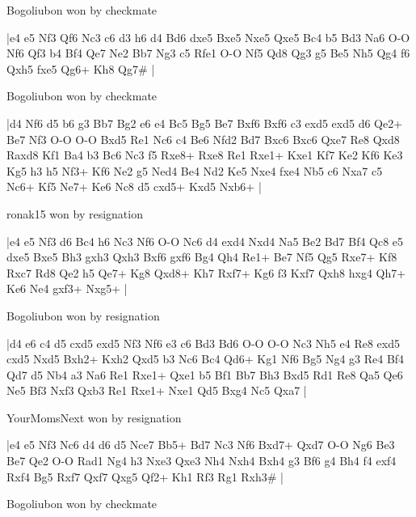 \showboard

Bogoliubon won by checkmate

\makegametitle
|e4 e5 Nf3 Qf6 Nc3 c6 d3 h6 d4 Bd6 dxe5 Bxe5 Nxe5 Qxe5 Bc4 b5 Bd3 Na6 O-O Nf6 Qf3 b4 Bf4 Qe7 Ne2 Bb7 Ng3 c5 Rfe1 O-O Nf5 Qd8 Qg3 g5 Be5 Nh5 Qg4 f6 Qxh5 fxe5 Qg6+ Kh8 Qg7\#  |

\showboard

Bogoliubon won by checkmate

\makegametitle
|d4 Nf6 d5 b6 g3 Bb7 Bg2 e6 e4 Bc5 Bg5 Be7 Bxf6 Bxf6 c3 exd5 exd5 d6 Qe2+ Be7 Nf3 O-O O-O Bxd5 Re1 Nc6 c4 Be6 Nfd2 Bd7 Bxc6 Bxc6 Qxe7 Re8 Qxd8 Raxd8 Kf1 Ba4 b3 Bc6 Nc3 f5 Rxe8+ Rxe8 Re1 Rxe1+ Kxe1 Kf7 Ke2 Kf6 Ke3 Kg5 h3 h5 Nf3+ Kf6 Ne2 g5 Ned4 Be4 Nd2 Ke5 Nxe4 fxe4 Nb5 c6 Nxa7 c5 Nc6+ Kf5 Ne7+ Ke6 Nc8 d5 cxd5+ Kxd5 Nxb6+  |

\showboard

ronak15 won by resignation

\makegametitle
|e4 e5 Nf3 d6 Bc4 h6 Nc3 Nf6 O-O Nc6 d4 exd4 Nxd4 Na5 Be2 Bd7 Bf4 Qc8 e5 dxe5 Bxe5 Bh3 gxh3 Qxh3 Bxf6 gxf6 Bg4 Qh4 Re1+ Be7 Nf5 Qg5 Rxe7+ Kf8 Rxc7 Rd8 Qe2 h5 Qe7+ Kg8 Qxd8+ Kh7 Rxf7+ Kg6 f3 Kxf7 Qxh8 hxg4 Qh7+ Ke6 Ne4 gxf3+ Nxg5+  |

\showboard

Bogoliubon won by resignation

\makegametitle
|d4 e6 c4 d5 cxd5 exd5 Nf3 Nf6 e3 c6 Bd3 Bd6 O-O O-O Nc3 Nh5 e4 Re8 exd5 cxd5 Nxd5 Bxh2+ Kxh2 Qxd5 b3 Nc6 Bc4 Qd6+ Kg1 Nf6 Bg5 Ng4 g3 Re4 Bf4 Qd7 d5 Nb4 a3 Na6 Re1 Rxe1+ Qxe1 b5 Bf1 Bb7 Bh3 Bxd5 Rd1 Re8 Qa5 Qe6 Ne5 Bf3 Nxf3 Qxb3 Re1 Rxe1+ Nxe1 Qd5 Bxg4 Nc5 Qxa7  |

\showboard

YourMomsNext won by resignation

\makegametitle
|e4 e5 Nf3 Nc6 d4 d6 d5 Nce7 Bb5+ Bd7 Nc3 Nf6 Bxd7+ Qxd7 O-O Ng6 Be3 Be7 Qe2 O-O Rad1 Ng4 h3 Nxe3 Qxe3 Nh4 Nxh4 Bxh4 g3 Bf6 g4 Bh4 f4 exf4 Rxf4 Bg5 Rxf7 Qxf7 Qxg5 Qf2+ Kh1 Rf3 Rg1 Rxh3\#  |

\showboard

Bogoliubon won by checkmate

